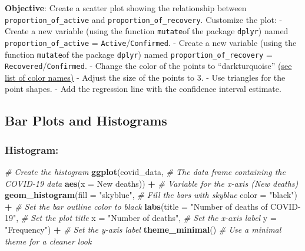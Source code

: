 \documentclass[
]{book}
\newenvironment{Shaded}{\begin{snugshade}}{\end{snugshade}}
\newcommand{\AttributeTok}[1]{\textcolor[rgb]{0.13,0.29,0.53}{#1}}
\newcommand{\CommentTok}[1]{\textcolor[rgb]{0.56,0.35,0.01}{\textit{#1}}}
\newcommand{\FunctionTok}[1]{\textcolor[rgb]{0.13,0.29,0.53}{\textbf{#1}}}
\newcommand{\NormalTok}[1]{#1}
\newcommand{\SpecialCharTok}[1]{\textcolor[rgb]{0.81,0.36,0.00}{\textbf{#1}}}
\newcommand{\StringTok}[1]{\textcolor[rgb]{0.31,0.60,0.02}{#1}}
\begin{document}
\textbf{Objective}: Create a scatter plot showing the relationship between \texttt{proportion\_of\_active} and \texttt{proportion\_of\_recovery}. Customize the plot:
- Create a new variable (using the function \texttt{mutate}of the package \texttt{dplyr}) named \texttt{proportion\_of\_active} = \texttt{Active}/\texttt{Confirmed}.
- Create a new variable (using the function \texttt{mutate}of the package \texttt{dplyr}) named \texttt{proportion\_of\_recovery} = \texttt{Recovered}/\texttt{Confirmed}.
- Change the color of the points to ``darkturquoise'' \href{https://sape.inf.usi.ch/quick-reference/ggplot2/colour}{(see list of color names)}
- Adjust the size of the points to 3.
- Use triangles for the point shapes.
- Add the regression line with the confidence interval estimate.

\subsection{Bar Plots and Histograms}\label{bar-plots-and-histograms}

\subsubsection{Histogram:}\label{histogram}

\begin{Shaded}
\begin{Highlighting}[]
\CommentTok{\# Create the histogram}
\FunctionTok{ggplot}\NormalTok{(covid\_data, }\CommentTok{\# The data frame containing the COVID{-}19 data}
       \FunctionTok{aes}\NormalTok{(}\AttributeTok{x =} \StringTok{\textasciigrave{}}\AttributeTok{New deaths}\StringTok{\textasciigrave{}}\NormalTok{)) }\SpecialCharTok{+} \CommentTok{\# Variable for the x{-}axis (New deaths)}
  \FunctionTok{geom\_histogram}\NormalTok{(}\AttributeTok{fill =} \StringTok{"skyblue"}\NormalTok{, }\CommentTok{\# Fill the bars with skyblue}
                 \AttributeTok{color =} \StringTok{"black"}\NormalTok{) }\SpecialCharTok{+} \CommentTok{\# Set the bar outline color to black}
  \FunctionTok{labs}\NormalTok{(}\AttributeTok{title =} \StringTok{"Number of deaths of COVID{-}19"}\NormalTok{, }\CommentTok{\# Set the plot title}
       \AttributeTok{x =} \StringTok{"Number of deaths"}\NormalTok{, }\CommentTok{\# Set the x{-}axis label}
       \AttributeTok{y =} \StringTok{"Frequency"}\NormalTok{) }\SpecialCharTok{+} \CommentTok{\# Set the y{-}axis label}
  \FunctionTok{theme\_minimal}\NormalTok{() }\CommentTok{\# Use a minimal theme for a cleaner look}
\end{Highlighting}
\end{Shaded}
\end{document}
